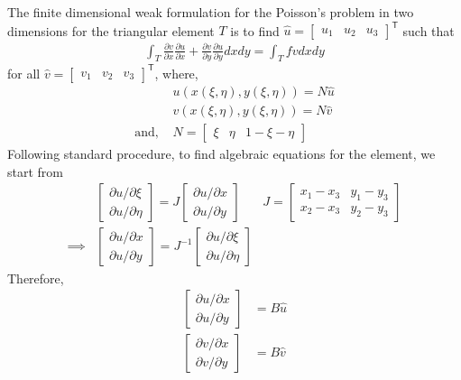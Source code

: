 \documentclass{article}
\newcommand{\pder}[2]{\frac{\partial #1}{\partial #2}}
\begin{document}
The finite dimensional weak formulation
for the Poisson's problem in two dimensions
for the triangular element $T$
is to find $\hat{u} = \begin{bmatrix} u_1 & u_2 & u_3 \end{bmatrix}^{\mathsf{T}}$
such that
\begin{align}
	\int_T \pder{v}{x}\pder{u}{x} + \pder{v}{y}\pder{u}{y} dxdy = \int_T fv dxdy \label{weak}
\end{align}
for all $\hat{v} = \begin{bmatrix} v_1 & v_2 & v_3 \end{bmatrix}^{\mathsf{T}}$,
where,
\begin{align*}
	& u(x(\xi,\eta), y(\xi,\eta)) = N \hat{u} \\
	& v(x(\xi,\eta), y(\xi,\eta)) = N \hat{v} \\
	\mbox{and, } & N = \begin{bmatrix} \xi & \eta & 1 - \xi - \eta \end{bmatrix}
\end{align*}
Following standard procedure,
to find algebraic equations for the element,
we start from
\begin{align*}
	& \begin{bmatrix} {\partial u}/{\partial \xi} \\ {\partial u}/{\partial \eta} \end{bmatrix}
		= J \begin{bmatrix} {\partial u}/{\partial x} \\ {\partial u}/{\partial y} \end{bmatrix} 
			& J = \begin{bmatrix} x_1 - x_3 & y_1 - y_3 \\ x_2 - x_3 & y_2 - y_3 \end{bmatrix} \\
	\implies & \begin{bmatrix} {\partial u}/{\partial x} \\ {\partial u}/{\partial y} \end{bmatrix}
		= J^{-1} \begin{bmatrix} {\partial u}/{\partial \xi} \\ {\partial u}/{\partial \eta} \end{bmatrix}
\end{align*}
Therefore,
\begin{align}
	\begin{bmatrix} {\partial u}/{\partial x} \\ {\partial u}/{\partial y} \end{bmatrix}
		&= B \hat{u} \label{ugrad} \\ 
	\begin{bmatrix} {\partial v}/{\partial x} \\ {\partial v}/{\partial y} \end{bmatrix}
		&= B \hat{v} \label{vgrad} \\ 
\end{align}
\end{document}
